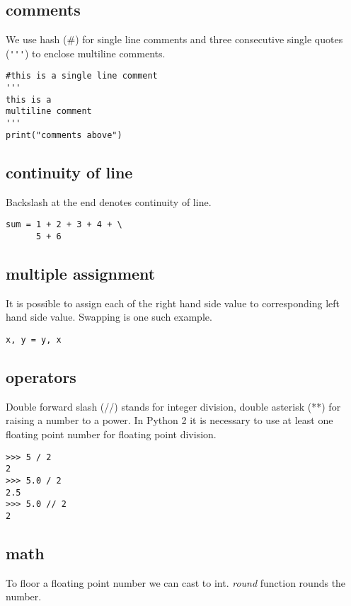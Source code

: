 \documentclass[a4paper, 12pt]{article}
\begin{document}
\subsection{comments}
We use hash (\#) for single line comments and three consecutive single quotes (\verb|'''|) to enclose multiline comments.
\begin{verbatim}
#this is a single line comment
'''
this is a
multiline comment
'''
print("comments above")
\end{verbatim}


\subsection{continuity of line}
Backslash at the end denotes continuity of line.
\begin{verbatim}
sum = 1 + 2 + 3 + 4 + \
      5 + 6
\end{verbatim}


\subsection{multiple assignment}
It is possible to assign each of the right hand side value to corresponding left hand side value. Swapping is one such example.
\begin{verbatim}
x, y = y, x
\end{verbatim}


\subsection{operators}
Double forward slash (//) stands for integer division, double asterisk (**) for raising a number to a power. In Python 2 it is necessary to use at least one floating point number for floating point division.
\begin{verbatim}
>>> 5 / 2
2
>>> 5.0 / 2
2.5
>>> 5.0 // 2
2
\end{verbatim}


\subsection{math}
To floor a floating point number we can cast to int. \emph{round} function rounds the number.
\end{document}
